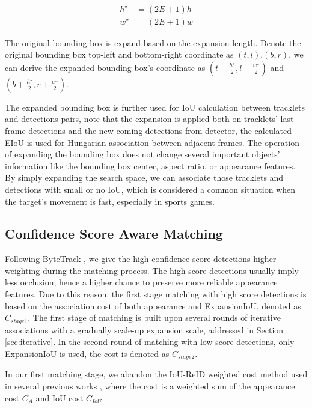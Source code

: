 \documentclass[10pt,twocolumn,letterpaper]{article}
\begin{document}
\begin{equation}
\begin{split}
h^{\star} &= (2E+1)h \\
w^{\star} &= (2E+1)w
\end{split}
\end{equation}

The original bounding box is expand based on the expansion length. Denote the original bounding box top-left and bottom-right coordinate as $(t,l)$,$(b,r)$, we can derive the expanded bounding box's coordinate as $(t-\frac{h^{\star}}{2},l-\frac{w^{\star}}{2})$ and $(b+\frac{h^{\star}}{2},r+\frac{w^{\star}}{2})$. 

The expanded bounding box is further used for IoU calculation between tracklets and detections pairs, note that the expansion is applied both on tracklets' last frame detections and the new coming detections from detector, the calculated EIoU is used for Hungarian association between adjacent frames. The operation of expanding the bounding box does not change several important objects' information like the bounding box center, aspect ratio, or appearance features. By simply expanding the search space, we can associate those tracklets and detections with small or no IoU, which is considered a common situation when the target's movement is fast, especially in sports games.

\subsection{Confidence Score Aware Matching}
Following ByteTrack \cite{ByteTrack}, we give the high confidence score detections higher weighting during the matching process. The high score detections usually imply less occlusion, hence a higher chance to preserve more reliable appearance features. Due to this reason, the first stage matching with high score detections is based on the association cost of both appearance and ExpansionIoU, denoted as $C_{stage1}$. The first stage of matching is built upon several rounds of iterative associations with a gradually scale-up expansion scale, addressed in Section \ref{sec:iterative}. In the second round of matching with low score detections, only ExpansionIoU is used, the cost is denoted as $C_{stage2}$. 

In our first matching stage, we abandon the IoU-ReID weighted cost method used in several previous works \cite{FairMOT,DeepSORT}, where the cost is a weighted sum of the appearance cost $C_A$ and IoU cost $C_{IoU}$:
\end{document}
